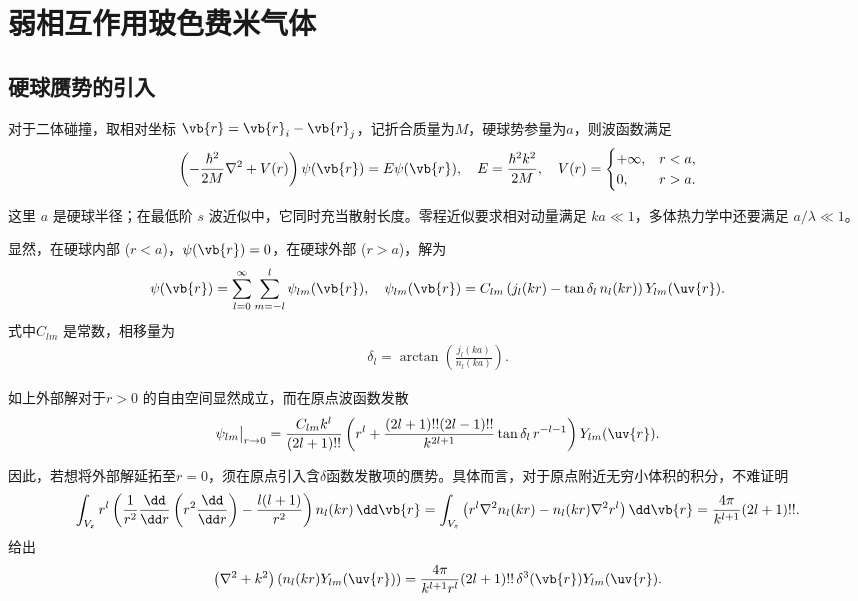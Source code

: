 
\chapter{弱相互作用玻色费米气体}

\section{硬球赝势的引入}

对于二体碰撞，取相对坐标 \(\vb{r} = \vb{r}_{i} - \vb{r}_{j}\)，记折合质量为\(M\)，硬球势参量为\(a\)，则波函数满足
\begin{align*}
	\left( -\frac{\hbar^{2}}{2M} \nabla^{2} + V(r) \right) \psi(\vb{r}) = E \psi(\vb{r}), \quad E = \frac{\hbar^{2} k^{2}}{2M}, \quad V(r) =
	\begin{cases}
		+\infty, & r < a, \\
		0,       & r > a.
	\end{cases}
\end{align*}

这里 \(a\) 是硬球半径；在最低阶 \(s\) 波近似中，它同时充当散射长度。零程近似要求相对动量满足 \(ka\ll1\)，多体热力学中还要满足 \(a/\lambda\ll1\)。

显然，在硬球内部 (\(r < a\))，\(\psi(\vb{r}) = 0\)，在硬球外部 (\(r > a\))，解为
\begin{align*}
	\psi(\vb{r}) = \sum_{l=0}^{\infty} \sum_{m=-l}^{l} \psi_{lm}(\vb{r}), \quad \psi_{lm}(\vb{r}) = C_{lm} \left( j_{l}(kr) - \tan\delta_{l} \, n_{l}(kr) \right) Y_{lm}(\uv{r}).
\end{align*}
式中\(C_{lm}\) 是常数，相移量为
\begin{align*}
	\delta_{l} = \arctan\left( \frac{j_{l}(ka)}{n_{l}(ka)} \right).
\end{align*}

如上外部解对于\(r > 0\) 的自由空间显然成立，而在原点波函数发散
\begin{align*}
	\psi_{lm}\big|_{r \to 0} = \frac{C_{lm} k^{l}}{(2l+1)!!} \left( r^{l} + \frac{(2l+1)!!(2l-1)!!}{k^{2l+1}} \tan\delta_{l} \, r^{-l-1} \right) Y_{lm}(\uv{r}).
\end{align*}

因此，若想将外部解延拓至\(r = 0\)，须在原点引入含\(\delta\)函数发散项的赝势。具体而言，对于原点附近无穷小体积的积分，不难证明
\begin{align*}
	\int_{V_{\varepsilon}} r^{l} \left( \frac{1}{r^{2}} \frac{\dd}{\dd r} \left( r^{2} \frac{\dd}{\dd r} \right) - \frac{l(l+1)}{r^{2}} \right) n_{l}(kr) \, \dd \vb{r} = \int_{V_{\varepsilon}} \left( r^{l} \nabla^{2} n_{l}(kr) - n_{l}(kr) \nabla^{2} r^{l} \right) \dd \vb{r} = \frac{4\pi}{k^{l+1}} (2l+1)!!.
\end{align*}
给出
\begin{align*}
	\left( \nabla^{2} + k^{2} \right) \left( n_{l}(kr) Y_{lm}(\uv{r}) \right) = \frac{4\pi}{k^{l+1} r^{l}} (2l+1)!! \, \delta^3(\vb{r}) Y_{lm}(\uv{r}).
\end{align*}

